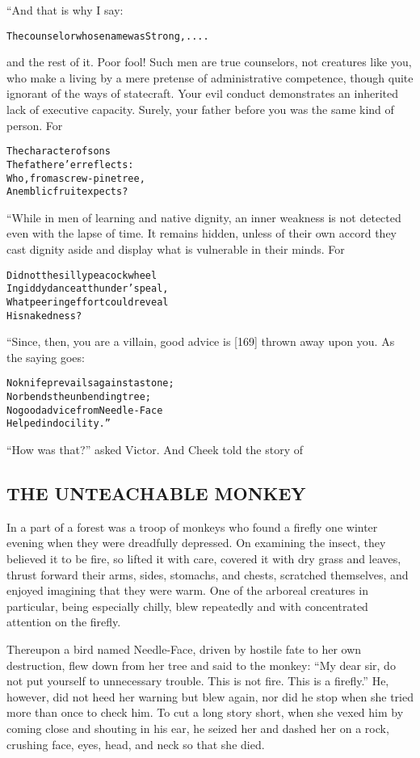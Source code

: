 \documentclass{article}
\renewenvironment{verbatim}{\begin{alltt}\normalfont\begin{centering}}{\end{centering}\end{alltt}}
\begin{document}
“And that is why I say:

\begin{verbatim}
The counselor whose name was Strong, ....
\end{verbatim}
and the rest of it. Poor fool! Such men are true counselors, not
creatures like you, who make a living by a mere pretense of
administrative competence, though quite ignorant of the ways of
statecraft. Your evil conduct demonstrates an inherited lack of
executive capacity. Surely, your father before you was the same
kind of person. For

\begin{verbatim}
The character of sons
    The father e'er reflects:
Who, from a screw-pine tree,
    An emblic fruit expects?
\end{verbatim}
“While in men of learning and native dignity, an inner weakness is
not detected even with the lapse of time. It remains hidden, unless
of their own accord they cast dignity aside and display what is
vulnerable in their minds. For

\begin{verbatim}
Did not the silly peacock wheel
In giddy dance at thunder's peal,
What peering effort could reveal
    His nakedness?
\end{verbatim}
“Since, then, you are a villain, good advice is [169] thrown away
upon you. As the saying goes:

\begin{verbatim}
No knife prevails against a stone;
    Nor bends the unbending tree;
No good advice from Needle-Face
    Helped indocility.”
\end{verbatim}
``How was that?'' asked Victor. And Cheek told the story of

\subsection{THE UNTEACHABLE MONKEY}

In a part of a forest was a troop of monkeys who found a firefly
one winter evening when they were dreadfully depressed. On
examining the insect, they believed it to be fire, so lifted it
with care, covered it with dry grass and leaves, thrust forward
their arms, sides, stomachs, and chests, scratched themselves, and
enjoyed imagining that they were warm. One of the arboreal
creatures in particular, being especially chilly, blew repeatedly
and with concentrated attention on the firefly.

Thereupon a bird named Needle-Face, driven by hostile fate to her
own destruction, flew down from her tree and said to the monkey:
``My dear sir, do not put yourself to unnecessary trouble. This is not fire. This is a firefly.''
He, however, did not heed her warning but blew again, nor did he
stop when she tried more than once to check him. To cut a long
story short, when she vexed him by coming close and shouting in his
ear, he seized her and dashed her on a rock, crushing face, eyes,
head, and neck so that she died.
\end{document}
